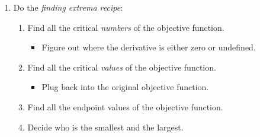 \begin{enumerate}[leftmargin=15pt]
    \item Do the \textit{finding extrema recipe}:
    \begin{enumerate}
        \item Find all the critical \textit{numbers} of the objective function.
        \begin{itemize}
            \item Figure out where the derivative is either zero or undefined.
        \end{itemize}
        \item Find all the critical \textit{values} of the objective function.
        \begin{itemize}
            \item Plug back into the original objective function.
        \end{itemize}
        \item Find all the endpoint values of the objective function.
        \item Decide who is the smallest and the largest.
    \end{enumerate}

\end{enumerate}

